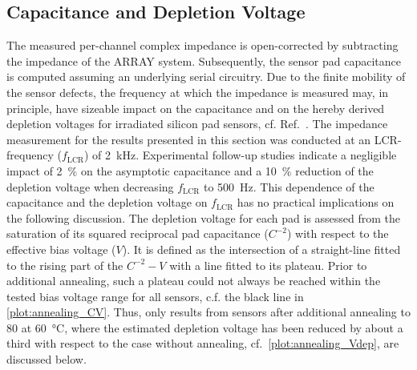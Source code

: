 \subsection{Capacitance and Depletion Voltage}
\label{subsec:Udep}

The measured per-channel complex impedance is open-corrected by subtracting the impedance of the ARRAY system.
Subsequently, the sensor pad capacitance is computed assuming an underlying serial circuitry.
Due to the finite mobility of the sensor defects, the frequency at which the impedance is measured may, in principle, have sizeable impact on the capacitance and on the hereby derived depletion voltages for irradiated silicon pad sensors, cf. Ref.~\cite{Li1991}.
The impedance measurement for the results presented in this section was conducted at an LCR-frequency ($f_\text{LCR}$) of \SI{2}{\kilo\hertz}.
Experimental follow-up studies indicate a negligible impact of \SI{2}{\percent} on the asymptotic capacitance and a \SI{10}{\percent} reduction of the depletion voltage when decreasing $f_\text{LCR}$ to \SI{500}{\hertz}.
This dependence of the capacitance and the depletion voltage on $f_\text{LCR}$ has no practical implications on the following discussion.
The depletion voltage for each pad is assessed from the saturation of its squared reciprocal pad capacitance ($C^{-2}$) with respect to the effective bias voltage ($V$). 
It is defined as the intersection of a straight-line fitted to the rising part of the $C^{-2}-V$ with a line fitted to its plateau.
Prior to additional annealing, such a plateau could not always be reached within the tested bias voltage range for all sensors, c.f. the black line in \ref{plot:annealing_CV}. 
Thus, only results from sensors after additional annealing to \SI{80}{\min} at \SI{60}{\celsius}, where the estimated depletion voltage has been reduced by about a third with respect to the case without annealing, cf.~\ref{plot:annealing_Vdep}, are discussed below. 
